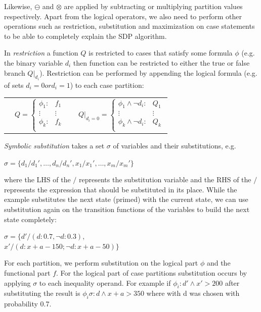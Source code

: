 \documentclass[letterpaper]{article}
\renewcommand{\-}{\text{-}}
\begin{document}
Likewise, $\ominus$ and $\otimes$ are applied by subtracting or multiplying partition values respectively.  
Apart from the logical operators, we also need to perform other operations such as restriction, substitution and maximization on case statements to be able to completely explain the SDP algorithm. 

In \emph{restriction} a function $Q$ is restricted to cases that satisfy some formula $\phi$ (e.g. the binary variable $d_i$ then function can be restricted to either the true or false branch $Q|_{d_i}$). Restriction can be performed by appending  the logical formula (e.g. of \InventoryControl sets $d_i=0 or d_i=1$) to each case partition:
{\footnotesize
\begin{center}
\begin{tabular}{r c c l}
&
\hspace{-6mm} 
  $Q = \begin{cases}
    \phi_1: & f_1 \\ 
   \vdots&\vdots\\ 
    \phi_k: & f_k \\ 
  \end{cases}$
&

&
\hspace{-2mm}
  $Q|_{d_i = 0} = \begin{cases}
    \phi_1 \land \neg d_i : & Q_1 \\ 
   \vdots&\vdots \\ 
    \phi_k \land \neg d_i : & Q_k \\ 
  \end{cases}$
\end{tabular}
\end{center}
}

\emph{Symbolic substitution} takes a set $\sigma$ of variables and their substitutions, e.g.
 
{\footnotesize
\begin{center}
$\sigma = \{ d_1 / d_1', \ldots, d_n / d_n', x_1 / x_1', \ldots, x_m / x_m' \}$ 
\end{center}
}
where the LHS of the $/$ represents the substitution variable and the RHS of the $/$ represents 
the expression that should be substituted in its place.
While the example substitutes the next state (primed) with the current state, we can use substitution again on the transition functions of the variables to build the next state completely:
{\footnotesize
\begin{center}
 $\sigma = \{ d'/(d:0.7,\neg d:0.3),$\\$ x'/(d: x + a - 150; \neg d: x + a - 50) \}$
\end{center}
}
For each partition, we perform substitution on the logical part $\phi$ and the functional part $f$. For the logical part of case partitions substitution occurs by applying $\sigma$ to each inequality operand. For example if $\phi_i: d' \wedge x'>200$ after substituting the result is $\phi_i\sigma : d \wedge x + a > 350 $ where with d was chosen with probability 0.7. 
\end{document}
